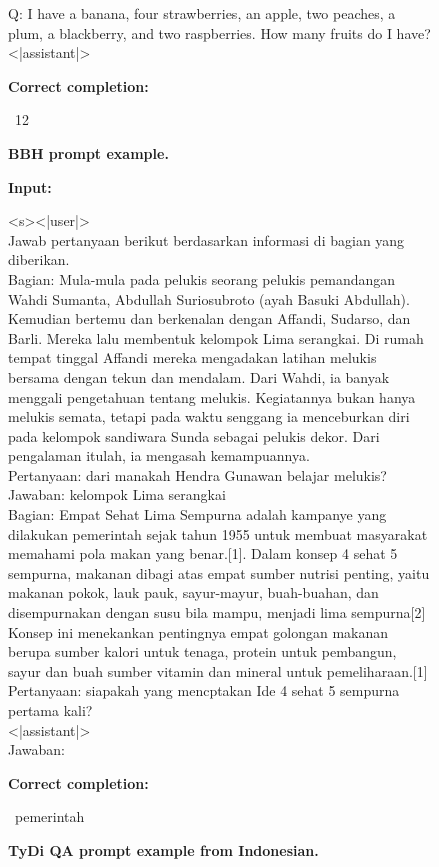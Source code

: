 \documentclass{article}
\begin{document}
\begin{figure}[htbp]
Q: I have a banana, four strawberries, an apple, two peaches, a plum, a blackberry, and two raspberries. How many fruits do I have?\\
<|assistant|>

\hrulefill

\textbf{Correct completion:}

\hrulefill

~12

\hrulefill

\caption{\textbf{BBH prompt example.}}
\label{fig:bbh}
\end{figure}


\begin{figure}[htbp]
\hrulefill

\textbf{Input:}

\hrulefill

<s><|user|>\\
Jawab pertanyaan berikut berdasarkan informasi di bagian yang diberikan.\\

Bagian: Mula-mula pada pelukis seorang pelukis pemandangan Wahdi Sumanta, Abdullah Suriosubroto (ayah Basuki Abdullah). Kemudian bertemu dan berkenalan dengan Affandi, Sudarso, dan Barli. Mereka lalu membentuk kelompok Lima serangkai. Di rumah tempat tinggal Affandi mereka mengadakan latihan melukis bersama dengan tekun dan mendalam. Dari Wahdi, ia banyak menggali pengetahuan tentang melukis. Kegiatannya bukan hanya melukis semata, tetapi pada waktu senggang ia menceburkan diri pada kelompok sandiwara Sunda sebagai pelukis dekor. Dari pengalaman itulah, ia mengasah kemampuannya.\\
Pertanyaan: dari manakah Hendra Gunawan belajar melukis?\\
Jawaban: kelompok Lima serangkai\\

Bagian: Empat Sehat Lima Sempurna adalah kampanye yang dilakukan pemerintah sejak tahun 1955 untuk membuat masyarakat memahami pola makan yang benar.[1]. Dalam konsep 4 sehat 5 sempurna, makanan dibagi atas empat sumber nutrisi penting, yaitu makanan pokok, lauk pauk, sayur-mayur, buah-buahan, dan disempurnakan dengan susu bila mampu, menjadi lima sempurna[2] Konsep ini menekankan pentingnya empat golongan makanan berupa sumber kalori untuk tenaga, protein untuk pembangun, sayur dan buah sumber vitamin dan mineral untuk pemeliharaan.[1]\\
Pertanyaan: siapakah yang mencptakan Ide 4 sehat 5 sempurna pertama kali?\\

<|assistant|>\\
Jawaban:

\hrulefill

\textbf{Correct completion:}

\hrulefill

~pemerintah

\hrulefill

\caption{\textbf{TyDi QA prompt example from Indonesian.}}
\label{fig:tydiqa}
\end{figure}
\end{document}
